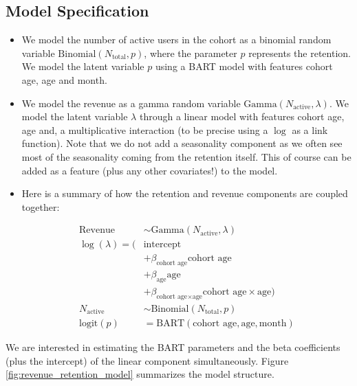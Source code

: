 \documentclass[11pt]{amsart}
\theoremstyle{definition}
\begin{document}
\subsection*{Model Specification} 
\begin{itemize}
    \item We model the number of active users in the cohort as a binomial random
        variable $\text{Binomial}(N_{\text{total}}, p)$, where the parameter $p$
        represents the retention. We model the latent variable $p$ using a BART model
        with features cohort age, age and month.
    
    \item We model the revenue as a gamma random variable
        $\text{Gamma}(N_{\text{active}}, \lambda)$. We model the latent variable
        $\lambda$ through a linear model with features cohort age, age and, a
        multiplicative interaction (to be precise using a $\log$ as a link function).
        Note that we do not add a seasonality component as we often see most of the
        seasonality coming from the retention itself. This of course can be added as a
        feature (plus any other covariates!) to the model.
    
    \item Here is a summary of how the retention and revenue components are coupled
        together:
    
    \begin{align*}
        \text{Revenue} & \sim \text{Gamma}(N_{\text{active}}, \lambda) \\
        \log(\lambda) = (& \text{intercept} \\
            & + \beta_{\text{cohort age}} \text{cohort age} \\
            & + \beta_{\text{age}} \text{age} \\
            & + \beta_{\text{cohort age} \times \text{age}} \text{cohort age} \times \text{age}) \\
        N_{\text{active}} & \sim \text{Binomial}(N_{\text{total}}, p) \\
        \textrm{logit}(p) & = \text{BART}(\text{cohort age}, \text{age}, \text{month})
    \end{align*}
    
\end{itemize}

We are interested in estimating the BART parameters and the beta coefficients (plus the
intercept) of the linear component simultaneously. Figure
\ref{fig:revenue_retention_model} summarizes the model structure.
\end{document}
